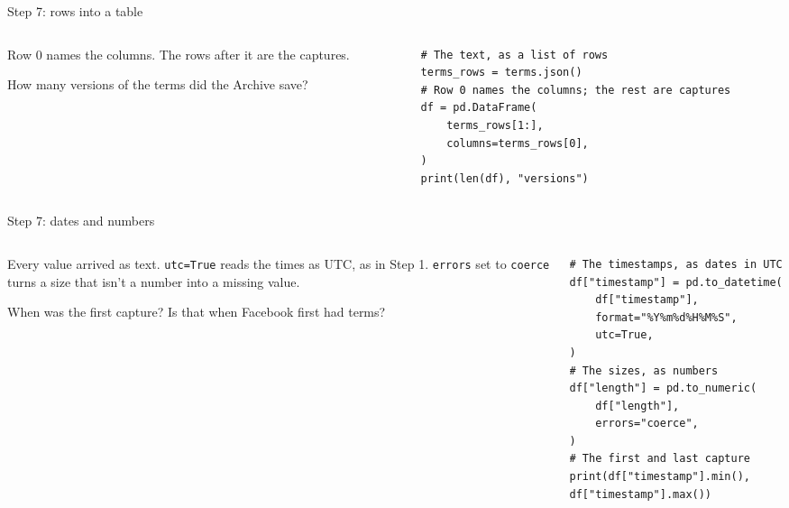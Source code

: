 \documentclass[9pt,aspectratio=169]{beamer}
\begin{document}
\begin{frame}[fragile]{Step 7: rows into a table}
    \begin{columns}[T]
        \begin{column}{0.37\textwidth}
            Row 0 names the columns. The rows after it are the captures.

            \medskip
            How many versions of the terms did the Archive save?
        \end{column}
        \begin{column}{0.6\textwidth}
\begin{lstlisting}
# The text, as a list of rows
terms_rows = terms.json()
# Row 0 names the columns; the rest are captures
df = pd.DataFrame(
    terms_rows[1:],
    columns=terms_rows[0],
)
print(len(df), "versions")
\end{lstlisting}
        \end{column}
    \end{columns}
\end{frame}

\begin{frame}[fragile]{Step 7: dates and numbers}
    \begin{columns}[T]
        \begin{column}{0.37\textwidth}
            Every value arrived as text. \texttt{utc=True} reads the times as UTC, as in Step 1. \texttt{errors} set to \texttt{coerce} turns a size that isn't a number into a missing value.

            \medskip
            When was the first capture? Is that when Facebook first had terms?
        \end{column}
        \begin{column}{0.6\textwidth}
\begin{lstlisting}
# The timestamps, as dates in UTC
df["timestamp"] = pd.to_datetime(
    df["timestamp"],
    format="%Y%m%d%H%M%S",
    utc=True,
)
# The sizes, as numbers
df["length"] = pd.to_numeric(
    df["length"],
    errors="coerce",
)
# The first and last capture
print(df["timestamp"].min(), df["timestamp"].max())
\end{lstlisting}
        \end{column}
    \end{columns}
\end{frame}
\end{document}
